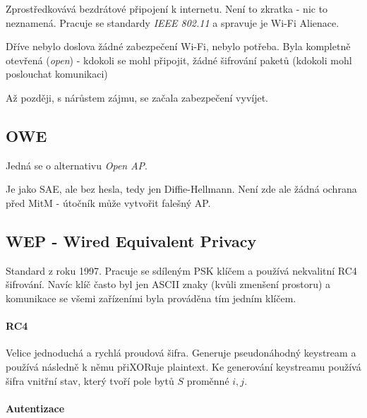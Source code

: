 \documentclass[10pt,a4paper]{article}
\begin{document}
Zprostředkovává bezdrátové připojení k internetu. Není to zkratka - nic to neznamená.
Pracuje se standardy \textit{IEEE 802.11} a spravuje je Wi-Fi Alienace.

Dříve nebylo doslova žádné zabezpečení Wi-Fi, nebylo potřeba. 
Byla kompletně otevřená (\textit{open}) - kdokoli se mohl připojit, žádné šifrování paketů (kdokoli mohl poslouchat komunikaci)

Až později, s nárůstem zájmu, se začala zabezpečení vyvíjet.

\subsection{OWE}

Jedná se o alternativu \textit{Open AP}.

Je jako SAE, ale bez hesla, tedy jen Diffie-Hellmann. 
Není zde ale žádná ochrana před MitM - útočník může vytvořit falešný AP.

\subsection{WEP - Wired Equivalent Privacy}

Standard z roku 1997.
Pracuje se sdíleným PSK klíčem a používá nekvalitní RC4 šifrování. 
Navíc klíč často byl jen ASCII znaky (kvůli zmenšení prostoru) a komunikace se všemi zařízeními byla prováděna tím jedním klíčem.

\paragraph{RC4} Velice jednoduchá a rychlá proudová šifra.
Generuje pseudonáhodný keystream a používá následně k němu přiXORuje plaintext. 
Ke generování keystreamu používá šifra vnitřní stav, který tvoří pole bytů $ S $ proměnné $ i,j $.

\paragraph{Autentizace}
\end{document}
